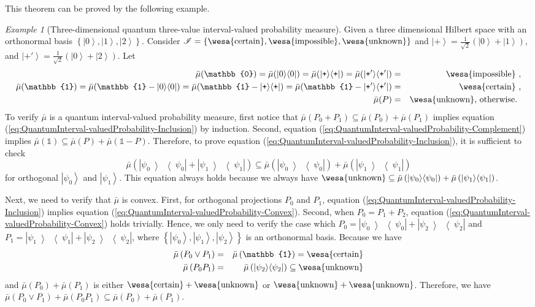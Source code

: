 \documentclass{article}
\theoremstyle{remark}
\newtheorem{example}{Example}
\newcommand{\imposs}{{\mbox{\wesa{impossible}}}}
\newcommand{\necess}{{\mbox{\wesa{certain}}}}
\newcommand{\unknown}{{\mbox{\wesa{unknown}}}}
\newcommand{\ket}[1]{{\left\vert{#1}\right\rangle}}
\newcommand{\op}[2]{\ensuremath{\left\vert{#1}\middle\rangle\middle\langle{#2}\right\vert}}
\newcommand{\proj}[1]{\op{#1}{#1}}
\newcommand{\ps}{\texttt{+}}
\begin{document}
This theorem can be proved by the following example. 

\begin{example}[Three-dimensional quantum three-value interval-valued
probability measure]\label{ex:three-dimensional-three-value} Given
a three dimensional Hilbert space with an orthonormal basis $\left\{ \ket{0},\ket{1},\ket{2}\right\} $.
Consider\emph{ $\mathscr{I}=\left\{ \necess,\imposs,\unknown\right\} $}
and $\ket{\ps}=\frac{1}{\sqrt{2}}(\ket{0}+\ket{1})$, and $\ket{\ps'}=\frac{1}{\sqrt{2}}(\ket{0}+\ket{2})$.
Let 
\begin{eqnarray*}
\bar{\mu}(\mathbb{0})=\bar{\mu}(\proj{0})=\bar{\mu}(\proj{\ps})=\bar{\mu}(\proj{\ps'}) & = & \imposs\textrm{ ,}\\
\bar{\mu}(\mathbb{1})=\bar{\mu}(\mathbb{1}-\proj{0})=\bar{\mu}(\mathbb{1}-\proj{\ps})=\bar{\mu}(\mathbb{1}-\proj{\ps'}) & = & \necess\textrm{ ,}\\
\bar{\mu}(P) & = & \unknown\textrm{, otherwise. }
\end{eqnarray*}
To verify $\bar{\mu}$ is a quantum interval-valued probability
measure, first notice that
$\bar{\mu}\left(P_{0}+P_{1}\right)\subseteq\bar{\mu}\left(P_{0}\right)+\bar{\mu}\left(P_{1}\right)$
implies equation
(\ref{eq:QuantumInterval-valuedProbability-Inclusion}) by
induction. Second, equation
(\ref{eq:QuantumInterval-valuedProbability-Complement}) implies
$\bar{\mu}\left(\mathbb{1}\right)\subseteq\bar{\mu}\left(P\right)+\bar{\mu}\left(\mathbb{1}-P\right)$.
Therefore, to prove equation
(\ref{eq:QuantumInterval-valuedProbability-Inclusion}), it is
sufficient to check
\[
\bar{\mu}\left(\proj{\psi_{0}}+\proj{\psi_{1}}\right)\subseteq\bar{\mu}\left(\proj{\psi_{0}}\right)+\bar{\mu}\left(\proj{\psi_{1}}\right)
\]
for orthogonal $\ket{\psi_{0}}$ and $\ket{\psi_{1}}$. This equation
always holds because we always have $\unknown\subseteq\bar{\mu}\left(\proj{\psi_{0}}\right)+\bar{\mu}\left(\proj{\psi_{1}}\right)$.

Next, we need to verify that $\bar{\mu}$ is convex. First, for orthogonal
projections $P_{0}$ and $P_{1}$, equation (\ref{eq:QuantumInterval-valuedProbability-Inclusion})
implies equation (\ref{eq:QuantumInterval-valuedProbability-Convex}).
Second, when $P_{0}=P_{1}+P_{2}$, equation
(\ref{eq:QuantumInterval-valuedProbability-Convex}) holds trivially.
Hence, we only need to verify the case which $P_{0}=\proj{\psi_{0}}+\proj{\psi_{2}}$
and $P_{1}=\proj{\psi_{1}}+\proj{\psi_{2}}$,
where $\left\{ \ket{\psi_{0}},\ket{\psi_{1}},\ket{\psi_{2}}\right\} $
is an orthonormal basis. Because we have 
\begin{eqnarray*}
\bar{\mu}\left(P_{0}\vee P_{1}\right) & = & \bar{\mu}\left(\mathbb{1}\right)=\necess\\
\bar{\mu}\left(P_{0}P_{1}\right) & = & \bar{\mu}\left(\proj{\psi_{2}}\right)\subseteq\unknown
\end{eqnarray*}
and $\bar{\mu}\left(P_{0}\right)+\bar{\mu}\left(P_{1}\right)$
is either $\necess+\unknown$ or $\unknown+\unknown$.
Therefore, we have $\bar{\mu}\left(P_{0}\vee P_{1}\right)+\bar{\mu}\left(P_{0}P_{1}\right)\subseteq\bar{\mu}\left(P_{0}\right)+\bar{\mu}\left(P_{1}\right)$.


\end{example}
\end{document}
